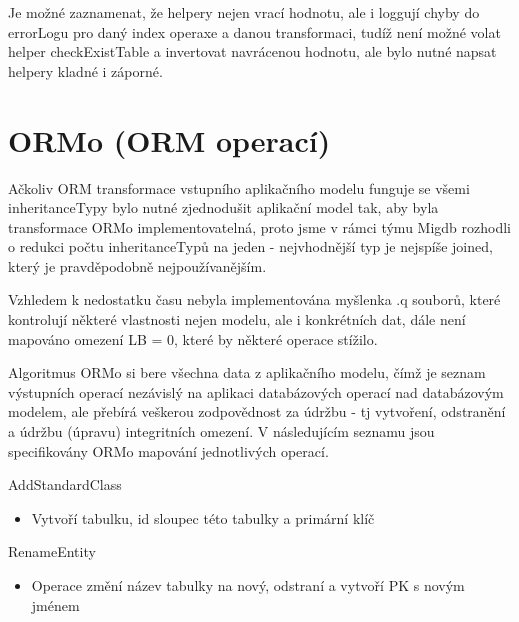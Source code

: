 \documentclass[11pt,twoside,a4paper]{book}
\begin{document}
Je možné zaznamenat, že helpery nejen vrací hodnotu, ale i loggují chyby do
errorLogu pro daný index operaxe a danou transformaci, tudíž není možné volat
helper checkExistTable a invertovat navrácenou hodnotu, ale bylo nutné napsat
helpery kladné i záporné.

\section{ORMo (ORM operací)}

Ačkoliv ORM transformace vstupního aplikačního modelu funguje se všemi
inheritanceTypy bylo nutné zjednodušit aplikační model tak, aby byla
transformace ORMo implementovatelná, proto jsme v rámci týmu Migdb rozhodli o
redukci počtu inheritanceTypů na jeden - nejvhodnější typ je nejspíše joined,
který je pravděpodobně nejpoužívanějším.

Vzhledem k nedostatku času nebyla implementována myšlenka .q souborů, které
kontrolují některé vlastnosti nejen modelu, ale i konkrétních dat, dále není
mapováno omezení LB = 0, které by některé operace stížilo. 

Algoritmus ORMo si bere všechna data z aplikačního modelu, čímž je seznam
výstupních operací nezávislý na aplikaci databázových operací nad databázovým
modelem, ale přebírá veškerou zodpovědnost za údržbu - tj vytvoření, odstranění
a údržbu (úpravu) integritních omezení.
V následujícím seznamu jsou specifikovány ORMo mapování jednotlivých operací.

\begin{list}{Operace :}{}
  \item AddStandardClass
  \begin{itemize}
    \item Vytvoří tabulku, id sloupec této tabulky a primární klíč
  \end{itemize}
  
  \item RenameEntity
  \begin{itemize}
    \item Operace změní název tabulky na nový, odstraní a vytvoří PK s
novým jménem
  \end{itemize}
\end{list}
\end{document}

